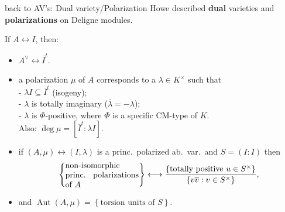\documentclass[usenames,dvipsnames,handout]{beamer}
\DeclareMathOperator{\Aut}{Aut}
\newcommand{\set}[1]{\left\lbrace#1\right\rbrace }
\begin{document}
\begin{frame}{ back to AV's: Dual variety/Polarization }
Howe described \textbf{dual} varieties and \textbf{polarizations} on Deligne modules.
\begin{theorem}[M.]
   If $A\leftrightarrow I$, then:
   \begin{itemize}
      \pause \item $A^\vee \leftrightarrow \overline{I}^t$.
      \pause \item a polarization $\mu$ of $A$ corresponds to a $\lambda\in K^\times$ such that\\
	    - $\lambda I \subseteq \overline{I}^t$ (isogeny);\\
	    - $\lambda$ is totally imaginary ($\overline \lambda = -\lambda$);\\
	    - $\lambda$ is $\Phi$-positive, where $\Phi$ is a specific CM-type of $K$.\\ 
      Also: $\deg \mu= [\overline{I}^t : \lambda I]$.
      \pause  \item if $(A,\mu) \leftrightarrow (I,\lambda)$ is a princ.~polarized ab.~var.~and $S=(I:I)$ then
     \vspace{-0.5em}
	      \[\set{\parbox[p]{9em}{non-isomorphic princ. polarizations of $A$}} \longleftrightarrow \dfrac{\set{\text{totally positive }u\in S^\times }}{\set{v\overline{v}: v\in S^\times}},\]
     \vspace{-1.5em}
	 \pause \item  and $\Aut(A,\mu) = \set{\text{torsion units of $S$}}$.
\end{itemize}
\end{theorem}
\end{frame}
\end{document}
